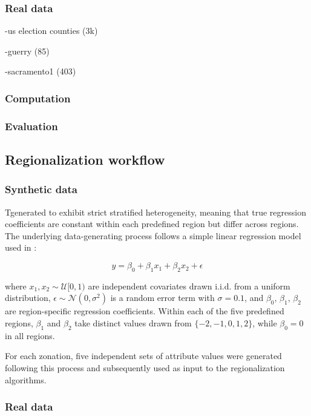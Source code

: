 \documentclass[
  english,
  12pt,
  a4paper,
]{article}
\begin{document}
\subsubsection{Real data}\label{real-data}

-us election counties (3k)

-guerry (85)

-sacramento1 (403)

\subsubsection{Computation}\label{computation}

\subsubsection{Evaluation}\label{evaluation}

\subsection{Regionalization workflow}\label{regionalization-workflow}

\subsubsection{Synthetic data}\label{synthetic-data-1}

Tgenerated to exhibit strict stratified heterogeneity, meaning that true
regression coefficients are constant within each predefined region but
differ across regions. The underlying data-generating process follows a
simple linear regression model used in \citet{guo2023}:

\[y = \beta_0 + \beta_1 x_1 + \beta_2 x_2 + \epsilon\]

where \(x_1, x_2 \sim \mathcal{U}[0, 1)\) are independent covariates
drawn i.i.d. from a uniform distribution,
\(\epsilon \sim \mathcal{N}(0, \sigma^2)\) is a random error term with
\(\sigma = 0.1\), and \(\beta_0\), \(\beta_1\), \(\beta_2\) are
region-specific regression coefficients. Within each of the five
predefined regions, \(\beta_1\) and \(\beta_2\) take distinct values
drawn from \(\{-2, -1, 0, 1, 2\}\), while \(\beta_0 = 0\) in all
regions.

For each zonation, five independent sets of attribute values were
generated following this process and subsequently used as input to the
regionalization algorithms.

\subsubsection{Real data}\label{real-data-1}
\end{document}
